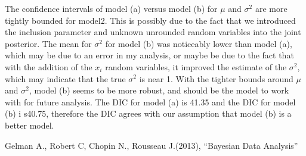 \documentclass{asaproc}
\begin{document}
The confidence intervals of model (a) versus model (b) for $\mu$ and $\sigma^2$ are more tightly bounded for model2.  This is possibly due to the fact that we introduced the inclusion parameter and unknown unrounded random variables into the joint posterior.  The mean for $\sigma^2$ for model (b) was noticeably lower than model (a), which may be due to an error in my analysis, or maybe be due to the fact that with the addition of the $x_{i}$ random variables, it improved the estimate of the $\sigma^2$, which may indicate that the true $\sigma^2$ is near 1.  With the tighter bounds around $\mu$ and $\sigma^2$, model (b) seems to be more robust, and should be the model to work with for future analysis. The DIC for model (a) is 41.35 and the DIC for model (b) i s40.75, therefore the DIC agrees with our assumption that model (b) is a better model. 


\begin{references}
{\footnotesize
\itemsep=3pt




\item Gelman A., Robert C, Chopin N., Rousseau J.(2013),  ``Bayesian Data Analysis''

}
\end{references}
\end{document}
